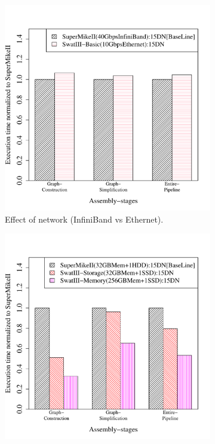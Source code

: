 \documentclass[conference]{IEEEtran}
\begin{document}
\begin{figure}[htb]
	\begin{subfigure}[b]{0.23\textwidth}
                \includegraphics[width=\textwidth]{Figure/PerormanceData/Plots/Network.pdf}
                \caption{Effect of network (InfiniBand vs Ethernet).}
                \label{fig:SuperMikeSwatBasic}
        \end{subfigure}
 	\begin{subfigure}[b]{0.23\textwidth}
                \includegraphics[width=\textwidth]{Figure/PerormanceData/Plots/StorageMemory.pdf}

\end{subfigure}
\end{figure}
\end{document}
